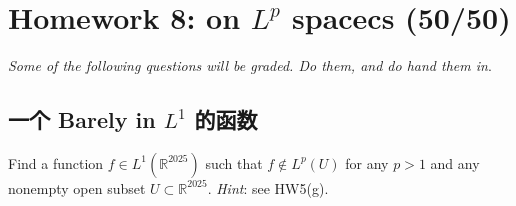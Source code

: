 \chapter{\texorpdfstring{Homework 8: on \(L^{p}\) spacecs (50/50)}{Homework 8: on L\^{}\{p\} spacecs (50/50)}}\label{homework-8-on-lp-spacecs-5050}

\emph{Some of the following questions will be graded. Do them, and do hand them in}.

\section{\texorpdfstring{一个 Barely in \(L^{1}\) 的函数}{一个 Barely in L\^{}\{1\} 的函数}}\label{ux4e00ux4e2a-barely-in-l1-ux7684ux51fdux6570}

Find a function \(f \in L^{1}(\mathbb{R}^{2025})\) such that \(f \notin L^{p}(U)\) for any \(p > 1\) and any nonempty open subset \(U \subset \mathbb{R}^{2025}\). \emph{Hint}: see HW5(g).

